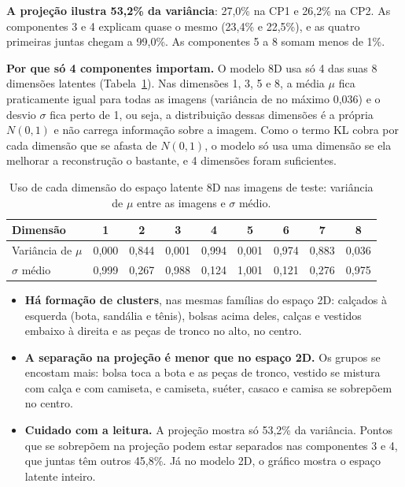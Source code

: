 \documentclass[11pt,a4paper]{article}
\begin{document}
\textbf{A projeção ilustra 53,2\% da variância}: 27,0\% na CP1 e 26,2\% na CP2. As componentes 3 e 4 explicam quase o mesmo (23,4\% e 22,5\%), e as quatro primeiras juntas chegam a 99,0\%. As componentes 5 a 8 somam menos de 1\%.

\textbf{Por que só 4 componentes importam.} O modelo 8D usa só 4 das suas 8 dimensões latentes (Tabela~\ref{tab:uso}). Nas dimensões 1, 3, 5 e 8, a média $\mu$ fica praticamente igual para todas as imagens (variância de no máximo 0,036) e o desvio $\sigma$ fica perto de 1, ou seja, a distribuição dessas dimensões é a própria $N(0, 1)$ e não carrega informação sobre a imagem. Como o termo KL cobra por cada dimensão que se afasta de $N(0, 1)$, o modelo só usa uma dimensão se ela melhorar a reconstrução o bastante, e 4 dimensões foram suficientes.

\begin{table}[H]
\centering
\small
\caption{Uso de cada dimensão do espaço latente 8D nas imagens de teste: variância de $\mu$ entre as imagens e $\sigma$ médio.}
\label{tab:uso}
\begin{tabular}{lcccccccc}
\toprule
\textbf{Dimensão} & 1 & 2 & 3 & 4 & 5 & 6 & 7 & 8 \\
\midrule
Variância de $\mu$ & 0,000 & 0,844 & 0,001 & 0,994 & 0,001 & 0,974 & 0,883 & 0,036 \\
$\sigma$ médio      & 0,999 & 0,267 & 0,988 & 0,124 & 1,001 & 0,121 & 0,276 & 0,975 \\
\bottomrule
\end{tabular}
\end{table}

\begin{itemize}
    \item \textbf{Há formação de clusters}, nas mesmas famílias do espaço 2D: calçados à esquerda (bota, sandália e tênis), bolsas acima deles, calças e vestidos embaixo à direita e as peças de tronco no alto, no centro.
    \item \textbf{A separação na projeção é menor que no espaço 2D.} Os grupos se encostam mais: bolsa toca a bota e as peças de tronco, vestido se mistura com calça e com camiseta, e camiseta, suéter, casaco e camisa se sobrepõem no centro.
    \item \textbf{Cuidado com a leitura.} A projeção mostra só 53,2\% da variância. Pontos que se sobrepõem na projeção podem estar separados nas componentes 3 e 4, que juntas têm outros 45,8\%. Já no modelo 2D, o gráfico mostra o espaço latente inteiro.
\end{itemize}
\end{document}
